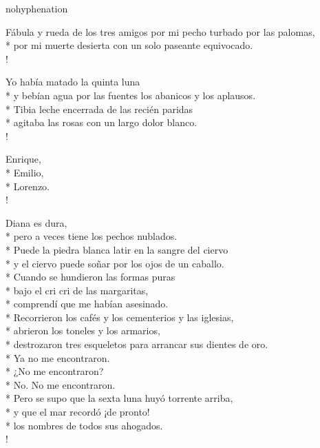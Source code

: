 \documentclass[
    a5paper,
    DIV=10,
    12pt,
    notitlepage,
    oneside,]
{scrbook} %
\begin{document}
\begin{hyphenrules}{nohyphenation}
\begin{poem}{Fábula y rueda de los tres amigos}{}{}
por mi pecho turbado por las palomas,\\*
por mi muerte desierta con un solo paseante equivocado.\\!

Yo había matado la quinta luna\\*
y bebían agua por las fuentes los abanicos y los aplausos.\\*
Tibia leche encerrada de las recién paridas\\*
agitaba las rosas con un largo dolor blanco.\\!

Enrique,\\*
Emilio,\\*
Lorenzo.\\!

Diana es dura,\\*
pero a veces tiene los pechos nublados.\\*
Puede la piedra blanca latir en la sangre del ciervo\\*
y el ciervo puede soñar por los ojos de un caballo.\\*
Cuando se hundieron las formas puras\\*
bajo el cri cri de las margaritas,\\*
comprendí que me habían asesinado.\\*
Recorrieron los cafés y los cementerios y las iglesias,\\*
abrieron los toneles y los armarios,\\*
destrozaron tres esqueletos para arrancar sus dientes de oro.\\*
Ya no me encontraron.\\*
¿No me encontraron?\\*
No. No me encontraron.\\*
Pero se supo que la sexta luna huyó torrente arriba,\\*
y que el mar recordó ¡de pronto!\\*
los nombres de todos sus ahogados.\\!

\end{poem}

\end{hyphenrules}
\end{document}
